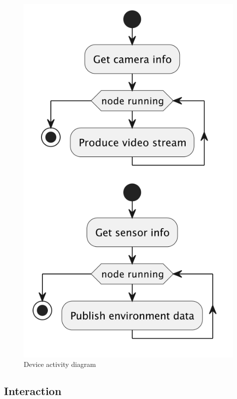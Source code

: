 \documentclass{scrartcl}
\begin{document}
    \begin{figure}
        \centering
        \includegraphics[scale=0.6]{img/device-activity}
        \caption{Device activity diagram}
        \label{fig:device-activity}
    \end{figure}


    \subsection{Interaction}
\end{document}
